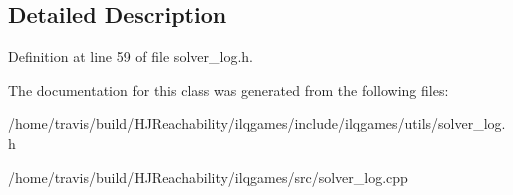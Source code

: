 \subsection{Detailed Description}


Definition at line 59 of file solver\+\_\+log.\+h.



The documentation for this class was generated from the following files\+:\begin{DoxyCompactItemize}
\item 
/home/travis/build/\+H\+J\+Reachability/ilqgames/include/ilqgames/utils/solver\+\_\+log.\+h\item 
/home/travis/build/\+H\+J\+Reachability/ilqgames/src/solver\+\_\+log.\+cpp\end{DoxyCompactItemize}
